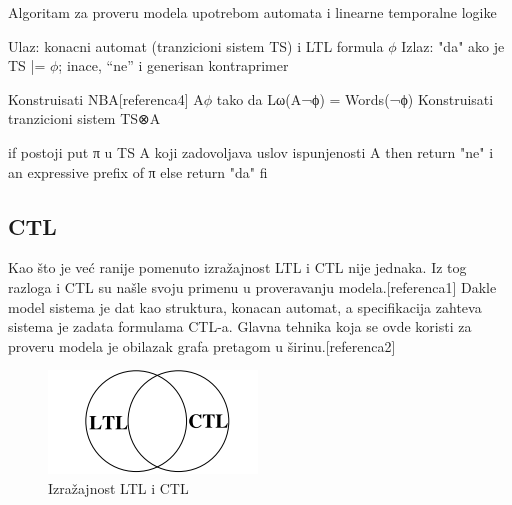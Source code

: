 \documentclass[a4paper]{article}
\begin{document}
	Algoritam za proveru modela upotrebom automata i linearne temporalne logike

	Ulaz: konacni automat (tranzicioni sistem TS) i LTL formula $\phi$ \newline
	Izlaz: "da" ako je TS |= $\phi$; inace, “ne” i generisan kontraprimer \newline

	Konstruisati NBA[referenca4] A\neg$\phi$ tako da Lω(A¬ϕ) = Words(¬ϕ) \newline
	Konstruisati tranzicioni sistem TS⊗A \newline

	if postoji put π u TS \circ A koji zadovoljava uslov ispunjenosti A then \newline
	return "ne" i an expressive prefix of π \newline
	else \newline
	return "da" \newline
	fi \newline

\subsection{CTL}
	\label{subsec:prCTL}
	
Kao što je već ranije pomenuto izražajnost LTL i CTL nije jednaka. Iz tog razloga i CTL su našle svoju primenu u proveravanju modela.[referenca1]
Dakle model sistema je dat kao struktura, konacan automat, a specifikacija zahteva sistema je zadata formulama CTL-a. 
Glavna tehnika koja se ovde koristi za proveru modela je obilazak grafa pretagom u širinu.[referenca2]

\begin{figure}[h!]
\begin{center}
\includegraphics[scale=1.5]{ltlctl.png}
\end{center}
\caption{Izražajnost LTL i CTL}
\label{fig:ltlctlex}
\end{figure}
\end{document}
